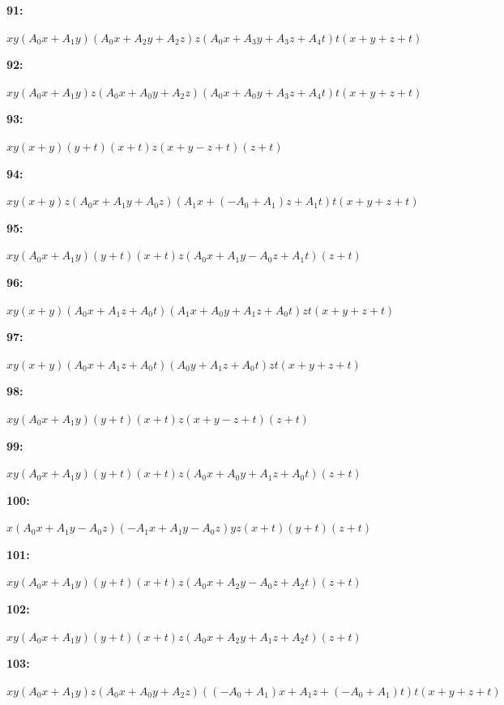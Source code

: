 \documentclass[12pt]{amsart}
\theoremstyle{plain}
\theoremstyle{remark}
\theoremstyle{definition}
\numberwithin{table}{section}
\begin{document}
\noindent\parbox[right]{9mm}{\textbf{91:}}\parbox{3mm}{\hfill}%
\parbox[t]{15cm}{\(xy(A_{0}x + A_{1}y)(A_{0}x + A_{2}y + A_{2}z)z(A_{0}x + A_{3}y + A_{3}z + A_{4}t)t(x + y + z + t)\)}

\noindent\parbox[right]{9mm}{\textbf{92:}}\parbox{3mm}{\hfill}%
\parbox[t]{15cm}{\(xy(A_{0}x + A_{1}y)z(A_{0}x + A_{0}y + A_{2}z)(A_{0}x + A_{0}y + A_{3}z + A_{4}t)t(x + y + z + t)\)}

\noindent\parbox[right]{9mm}{\textbf{93:}}\parbox{3mm}{\hfill}%
\parbox[t]{15cm}{\(xy(x + y)(y + t)(x + t)z(x + y - z + t)(z + t)\)}

\noindent\parbox[right]{9mm}{\textbf{94:}}\parbox{3mm}{\hfill}%
\parbox[t]{15cm}{\(xy(x + y)z(A_{0}x + A_{1}y + A_{0}z)(A_{1}x + (-A_{0} + A_{1})z + A_{1}t)t(x + y + z + t)\)}

\noindent\parbox[right]{9mm}{\textbf{95:}}\parbox{3mm}{\hfill}%
\parbox[t]{15cm}{\(xy(A_{0}x + A_{1}y)(y + t)(x + t)z(A_{0}x + A_{1}y - A_{0}z + A_{1}t)(z + t)\)}

\noindent\parbox[right]{9mm}{\textbf{96:}}\parbox{3mm}{\hfill}%
\parbox[t]{15cm}{\(xy(x + y)(A_{0}x + A_{1}z + A_{0}t)(A_{1}x + A_{0}y + A_{1}z + A_{0}t)zt(x + y + z + t)\)}

\noindent\parbox[right]{9mm}{\textbf{97:}}\parbox{3mm}{\hfill}%
\parbox[t]{15cm}{\(xy(x + y)(A_{0}x + A_{1}z + A_{0}t)(A_{0}y + A_{1}z + A_{0}t)zt(x + y + z + t)\)}

\noindent\parbox[right]{9mm}{\textbf{98:}}\parbox{3mm}{\hfill}%
\parbox[t]{15cm}{\(xy(A_{0}x + A_{1}y)(y + t)(x + t)z(x + y - z + t)(z + t)\)}

\noindent\parbox[right]{9mm}{\textbf{99:}}\parbox{3mm}{\hfill}%
\parbox[t]{15cm}{\(xy(A_{0}x + A_{1}y)(y + t)(x + t)z(A_{0}x + A_{0}y + A_{1}z + A_{0}t)(z + t)\)}

\noindent\parbox[right]{9mm}{\textbf{100:}}\parbox{3mm}{\hfill}%
\parbox[t]{15cm}{\(x(A_{0}x + A_{1}y - A_{0}z)(-A_{1}x + A_{1}y - A_{0}z)yz(x + t)(y + t)(z + t)\)}

\noindent\parbox[right]{9mm}{\textbf{101:}}\parbox{3mm}{\hfill}%
\parbox[t]{15cm}{\(xy(A_{0}x + A_{1}y)(y + t)(x + t)z(A_{0}x + A_{2}y - A_{0}z + A_{2}t)(z + t)\)}

\noindent\parbox[right]{9mm}{\textbf{102:}}\parbox{3mm}{\hfill}%
\parbox[t]{15cm}{\(xy(A_{0}x + A_{1}y)(y + t)(x + t)z(A_{0}x + A_{2}y + A_{1}z + A_{2}t)(z + t)\)}

\noindent\parbox[right]{9mm}{\textbf{103:}}\parbox{3mm}{\hfill}%
\parbox[t]{15cm}{\(xy(A_{0}x + A_{1}y)z(A_{0}x + A_{0}y + A_{2}z)((-A_{0} + A_{1})x + A_{1}z + (-A_{0} + A_{1})t)t(x + y + z + t)\)}
\end{document}
